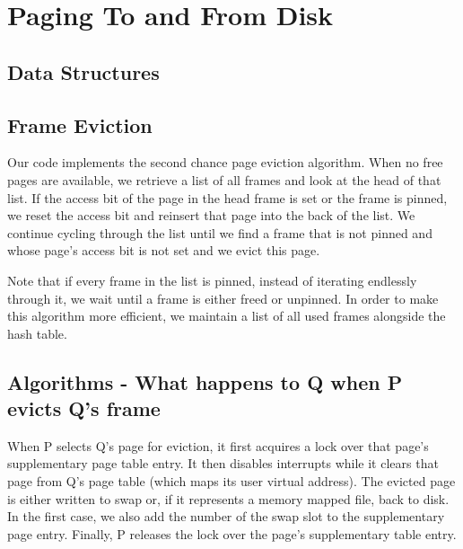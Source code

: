 
\section{Paging To and From Disk}

\subsection{Data Structures}


\subsection{Frame Eviction}

Our code implements the second chance page eviction algorithm.
When no free pages are available, we retrieve a list of all frames and look at the head of that list.
If the access bit of the page in the head frame is set or the frame is pinned, we reset the access bit and reinsert that page into the back of the list.
We continue cycling through the list until we find a frame that is not pinned and whose page's access bit is not set and we evict this page.

Note that if every frame in the list is pinned, instead of iterating endlessly through it, we wait until a frame is either freed or unpinned.
In order to make this algorithm more efficient, we maintain a list of all used frames alongside the hash table.

\subsection{Algorithms - What happens to Q when P evicts Q's frame}

When P selects Q's page for eviction, it first acquires a lock over that page's supplementary page table entry.
It then disables interrupts while it clears that page from Q's page table (which maps its user virtual address).
The evicted page is either written to swap or, if it represents a memory mapped file, back to disk.
In the first case, we also add the number of the swap slot to the supplementary page entry.
Finally, P releases the lock over the page's supplementary table entry.

